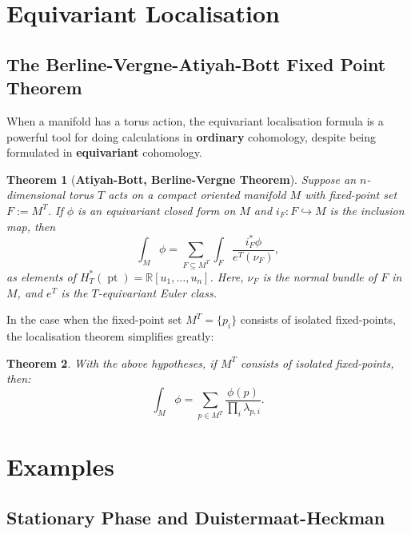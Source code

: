 \documentclass{article}
\newtheorem{theorem}{Theorem}[section]
\newcommand{\RR}{\mathbb{R}}
\DeclareMathOperator{\pt}{pt}
\begin{document}
\newpage

\section{Equivariant Localisation}






\subsection{The Berline-Vergne-Atiyah-Bott Fixed Point Theorem}

When a manifold has a torus action, the equivariant localisation formula is a powerful tool for doing calculations in \textbf{ordinary} cohomology, despite being formulated in \textbf{equivariant} cohomology.

\begin{theorem}[\textbf{Atiyah-Bott, Berline-Vergne Theorem}]
	Suppose an $n$-dimensional torus $T$ acts on a compact oriented manifold $M$ with fixed-point set $F := M^{T}$. If $\phi$ is an equivariant closed form on $M$ and $i_{F}: F \hookrightarrow M$ is the inclusion map, then
	\begin{equation*}
		\int_{M} \phi = \sum\limits_{F \subseteq M^{T}} \int_{F} \frac{i_{F}^{\ast} \phi}{e^{T}(\nu_{F})},
	\end{equation*}
	as elements of $H_{T}^{\ast}(\pt) = \RR[u_{1}, \ldots, u_{n}]$. Here, $\nu_{F}$ is the normal bundle of $F$ in $M$, and $e^{T}$ is the $T$-equivariant Euler class.
\end{theorem}

In the case when the fixed-point set $M^{T} = \{p_{i}\}$ consists of isolated fixed-points, the localisation theorem simplifies greatly:

\begin{theorem}
	With the above hypotheses, if $M^{T}$ consists of isolated fixed-points, then:
	\begin{equation*}
		\int_{M} \phi = \sum\limits_{p \in M^{T}} \frac{\phi(p)}{\prod_{i} \lambda_{p, i}}.
	\end{equation*}
\end{theorem}


\section{Examples}

\subsection{Stationary Phase and Duistermaat-Heckman}
\end{document}
